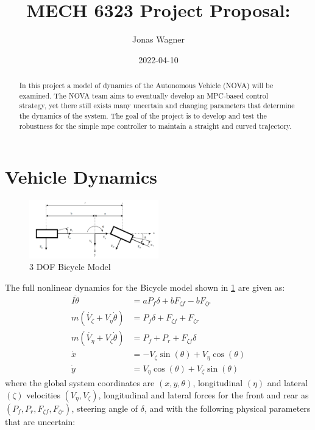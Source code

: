 \documentclass[]{article}
\title{MECH 6323 Project Proposal:\\
}
\author{Jonas Wagner}
\date{2022-04-10}
\begin{document}
\maketitle

\begin{abstract}
    In this project a model of dynamics of the Autonomous Vehicle (NOVA) will be examined. 
    The NOVA team aims to eventually develop an MPC-based control strategy, yet there still exists many uncertain and changing parameters that determine the dynamics of the system.
    The goal of the project is to develop and test the robustness for the simple mpc controller to maintain a straight and curved trajectory.
\end{abstract}

\section{Vehicle Dynamics}
\begin{figure}[h]
    \centering
    \includegraphics[width=0.5\textwidth]{figs/3dof_model_diag.png}
    \caption{3 DOF Bicycle Model}
    \label{fig:3dof_bike_model}
\end{figure}
The full nonlinear dynamics for the Bicycle model shown in \figurename{\ref{fig:3dof_bike_model}} are given as: \begin{align*}
    I \ddot{\theta}     &= a P_f \delta + b F_{\zeta f} - b F_{\zeta r}\\
    m (\dot{V_{\zeta}} + V_\eta \dot{\theta}) &= P_f \delta + F_{\zeta f} + F_{\zeta r}\\
    m(\dot{V_{\eta}} + V_\zeta \dot{\theta}) &= P_f + P_r + F_{\zeta f} \delta\\
    \dot{x} &= -V_{\zeta} \sin(\theta) + V_{\eta} \cos(\theta)\\
    \dot{y} &= V_{\eta} \cos(\theta) + V_{\zeta} \sin(\theta)
\end{align*}
where the global system coordinates are $(x, y, \theta)$, 
longitudinal $(\eta)$ and lateral $(\zeta)$ velocities $(V_\eta, V_\zeta)$,
longitudinal and lateral forces for the front and rear as $(P_f,P_r,F_{\zeta f},F_{\zeta r})$,
steering angle of $\delta$, 
and with the following physical parameters that are uncertain:
\end{document}
